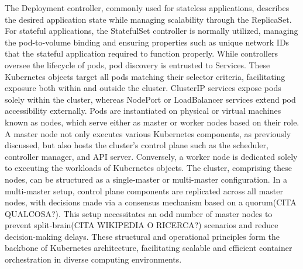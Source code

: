 The Deployment controller, commonly used for stateless applications, describes the desired application state while managing scalability through the ReplicaSet. For stateful applications, the StatefulSet controller is normally utilized, managing the pod-to-volume binding and ensuring properties such as unique network IDs that the stateful application required to function properly.
While controllers oversee the lifecycle of pods, pod discovery is entrusted to Services. These Kubernetes objects target all pods matching their selector criteria, facilitating exposure both within and outside the cluster. ClusterIP services expose pods solely within the cluster, whereas NodePort or LoadBalancer services extend pod accessibility externally.
Pods are instantiated on physical or virtual machines known as nodes, which serve either as master or worker nodes based on their role. A master node not only executes various Kubernetes components, as previously discussed, but also hosts the cluster's control plane such as the scheduler, controller manager, and API server. Conversely, a worker node is dedicated solely to executing the workloads of Kubernetes objects.
The cluster, comprising these nodes, can be structured as a single-master or multi-master configuration. In a multi-master setup, control plane components are replicated across all master nodes, with decisions made via a consensus mechanism based on a quorum(CITA QUALCOSA?). This setup necessitates an odd number of master nodes to prevent split-brain(CITA WIKIPEDIA O RICERCA?) scenarios and reduce decision-making delays. These structural and operational principles form the backbone of Kubernetes architecture, facilitating scalable and efficient container orchestration in diverse computing environments.

